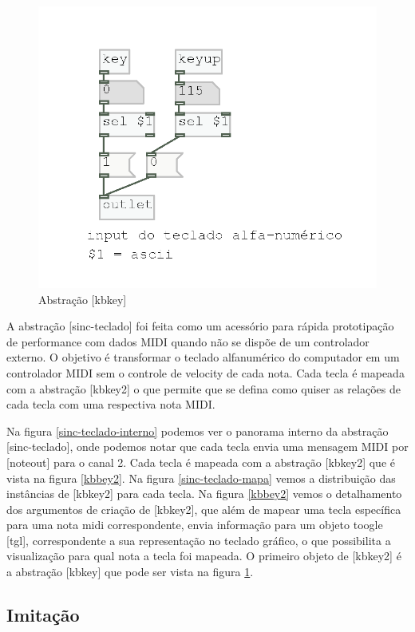 \documentclass{ppgmus}
\begin{document}
\begin{figure}
\includegraphics[scale=.5]{kbkey}
\caption{Abstração [kbkey]}
\label{kbkey}
\end{figure}


A abstração [sinc-teclado] foi feita como um acessório para rápida prototipação de 
performance com dados MIDI quando não se dispõe de um controlador externo. O objetivo
é transformar o teclado alfanumérico do computador em um controlador MIDI sem o controle de velocity
de cada nota. Cada tecla é mapeada com a abstração [kbkey2] o que permite que se defina como quiser
as relações de cada tecla com uma respectiva nota MIDI.

Na figura \ref{sinc-teclado-interno} podemos ver o panorama interno da abstração [sinc-teclado], onde podemos notar
que cada tecla envia uma mensagem MIDI por [noteout] para o canal 2.
Cada tecla é mapeada com a abstração [kbkey2] que é vista na figura \ref{kbbey2}. 
Na figura \ref{sinc-teclado-mapa} vemos a distribuição das instâncias de [kbkey2] para
cada tecla. Na figura \ref{kbbey2} vemos o detalhamento dos argumentos de criação de [kbkey2], que além de mapear
uma tecla específica para uma nota midi correspondente, envia informação para um objeto toogle [tgl],
correspondente a sua representação no teclado gráfico, o que possibilita a visualização para qual nota
a tecla foi mapeada. O primeiro objeto de [kbkey2] é a abstração [kbkey] que pode ser vista na figura \ref{kbkey}.




\subsection{Imitação}
\end{document}
